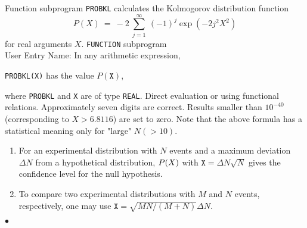                
      
      \Submitter{}                 
                     
Function subprogram {\tt PROBKL} calculates the Kolmogorov distribution
function
$$P(X) \ = \
-2 \ \sum_{j=1}^\infty \ (-1)^j \exp(-2j^2X^2) $$
for real arguments $X$.
\Structure
{\tt FUNCTION} subprogram \\
User Entry Name: 
\Usage
In any arithmetic expression,
\begin{center}
{\tt PROBKL(X)} \quad has the value \quad $P(\mathtt{X})$,
\end{center}
where {\tt PROBKL} and {\tt X} are of type {\tt REAL}.
\Method
Direct evaluation or using functional relations.
\Accuracy
Approximately seven digits are correct.
Results smaller than $10^{-40}$ (corresponding to $X > 6.8116$)
are set to zero. Note that the above formula has a statistical meaning
only for "large" $N (>10)$.
\Notes
\begin{enumerate}
\item For an experimental distribution with $N$ events and a maximum
deviation $\Delta N$ from a hypothetical distribution,
$P({\tt X})$ with $\mathtt{X} = \Delta N \sqrt{N}$ gives the confidence
level for the null hypothesis.
\item To compare two experimental distributions with $M$ and $N$ events,
respectively, one may use
$\mathtt{X} = \sqrt{M N/(M + N)} \Delta N$.
\end{enumerate}
$\bullet$
